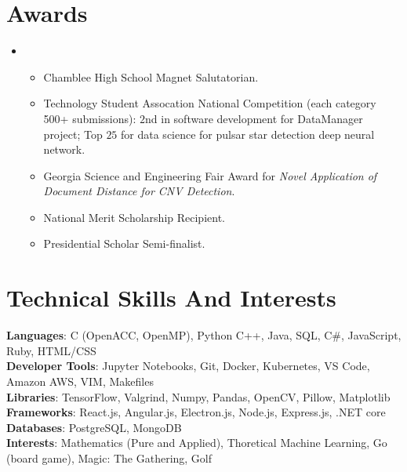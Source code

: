 \documentclass[letterpaper,10pt]{article}
\newcommand{\resumeItem}[1]{

  \item[$\circ$]\small{
    {#1 \vspace{-2pt}}
  }
}
\newcommand{\resumeItemListStart}{\begin{itemize}[rightmargin=1.9cm]}
\newcommand{\resumeItemListEnd}{\end{itemize}\vspace{-5pt}}
\begin{document}
\section{Awards}
\begin{itemize}[leftmargin=0.15in, label={}]
  \item{
              \resumeItemListStart
              \resumeItem{Chamblee High School Magnet Salutatorian.}
              \resumeItem{Technology Student Assocation National Competition (each category 500+ submissions): $2$nd in software development for DataManager project; Top $25$ for data science for pulsar star detection deep neural network.}
              \resumeItem{Georgia Science and Engineering Fair Award for \textit{Novel Application of Document Distance for CNV Detection}.}
              \resumeItem{National Merit Scholarship Recipient.}
              \resumeItem{Presidential Scholar Semi-finalist.}
              \resumeItemListEnd

        }
  \vspace{3pt}

\end{itemize}
\section{Technical Skills And Interests}
\begin{itemize}[leftmargin=0.15in, label={}]
  \small{\item{
                \textbf{Languages}{: C (OpenACC, OpenMP), Python C++, Java, SQL, C\#, JavaScript, Ruby, HTML/CSS}\\
                \textbf{Developer Tools}{: Jupyter Notebooks, Git, Docker, Kubernetes, VS Code, Amazon AWS, VIM, Makefiles} \\
                \textbf{Libraries}{: TensorFlow, Valgrind, Numpy, Pandas, OpenCV, Pillow, Matplotlib}\\
                \textbf{Frameworks}{: React.js, Angular.js, Electron.js, Node.js, Express.js, .NET core} \\
                \textbf{Databases}{: PostgreSQL, MongoDB}\\
                \textbf{Interests}{: Mathematics (Pure and Applied), Thoretical Machine Learning, Go (board game), Magic: The Gathering, Golf\\
                }}}
\end{itemize}
\end{document}
